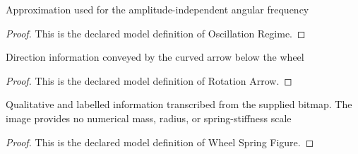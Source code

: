 \begin{definition}
  \label{def:physics:phyx-mini-0272:phyxminiproblems-problemphyxmini0272-oscillationregime}
  Approximation used for the amplitude-independent angular frequency
\end{definition}
\begin{proof}
  This is the declared model definition of Oscillation Regime.
\end{proof}
\begin{definition}
  \label{def:physics:phyx-mini-0272:phyxminiproblems-problemphyxmini0272-rotationarrow}
  Direction information conveyed by the curved arrow below the wheel
\end{definition}
\begin{proof}
  This is the declared model definition of Rotation Arrow.
\end{proof}
\begin{definition}
  \label{def:physics:phyx-mini-0272:phyxminiproblems-problemphyxmini0272-wheelspringfigure}
  Qualitative and labelled information transcribed from the supplied bitmap. The image provides no numerical mass, radius, or spring-stiffness scale
\end{definition}
\begin{proof}
  This is the declared model definition of Wheel Spring Figure.
\end{proof}

